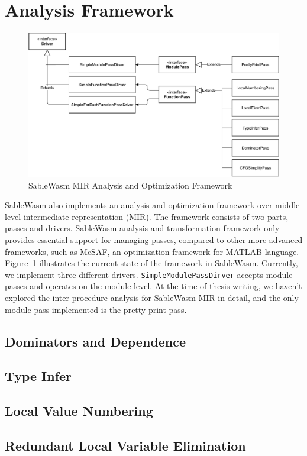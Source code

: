 \section{Analysis Framework}
\begin{figure}
  \centering
  \includegraphics[width=\textwidth]{Images/4.MIR/analysis-framework.pdf}
  \caption{SableWasm MIR Analysis and Optimization Framework}
  \label{fig:sablewasm-mir-analysis-framework}
\end{figure}
SableWasm also implements an analysis and optimization framework over middle-level intermediate representation (MIR). The framework consists of two parts, passes and drivers. SableWasm analysis and transformation framework only provides essential support for managing passes, compared to other more advanced frameworks, such as McSAF\cite{mcsaf}, an optimization framework for MATLAB language. Figure~\ref{fig:sablewasm-mir-analysis-framework} illustrates the current state of the framework in SableWasm. Currently, we implement three different drivers. \texttt{SimpleModulePassDirver} accepts module passes and operates on the module level. At the time of thesis writing, we haven't explored the inter-procedure analysis for SableWasm MIR in detail, and the only module pass implemented is the pretty print pass.



\subsection{Dominators and Dependence}

\subsection{Type Infer}

\subsection{Local Value Numbering}

\subsection{Redundant Local Variable Elimination}